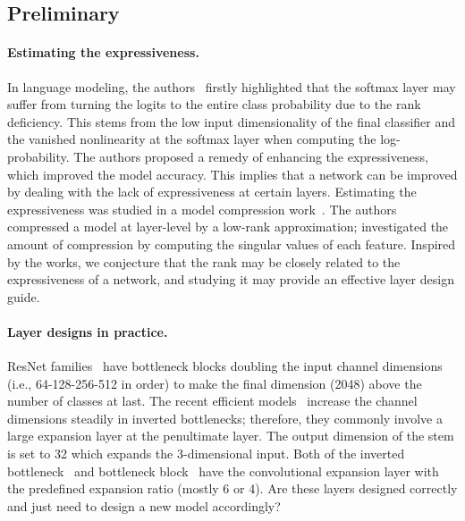 \subsection{Preliminary}
\label{subsection:preliminary}
\paragraph{Estimating the expressiveness.} 
In language modeling, the authors~\cite{yang2017breaking} firstly highlighted that the softmax layer may suffer from turning the logits to the entire class probability due to the rank deficiency. This stems from the low input dimensionality of the final classifier and the vanished nonlinearity at the softmax layer when computing the log-probability. The authors proposed a remedy of enhancing the expressiveness, which improved the model accuracy. This implies that a network can be improved by dealing with the lack of expressiveness at certain layers. Estimating the expressiveness was studied in a model compression work~\cite{zhang2015efficient}. The authors compressed a model at layer-level by a low-rank approximation; investigated the amount of compression by computing the singular values of each feature. Inspired by the works, we conjecture that the rank may be closely related to the expressiveness of a network, and studying it may provide an effective layer design guide.
\vspace{-4mm}

\paragraph{Layer designs in practice.} ResNet families~\cite{resnet, preresnet,resnext} have bottleneck blocks doubling the input channel dimensions (i.e., 64-128-256-512 in order) to make the final dimension (2048) above the number of classes at last. The recent efficient models~\cite{fbnet, chamnet, proxylessnas,mobilenetv3,mnasnet, tan2019mixconv,efficientnet, fbnetv2, mei2020atomnas, chu2019fairnas, chu2019fairdarts, liang2019dartsplus} increase the channel dimensions steadily in inverted bottlenecks; therefore, they commonly involve a large expansion layer at the penultimate layer. The output dimension of the stem is set to 32 which expands the 3-dimensional input. Both of the inverted bottleneck~\cite{mobilenetv2} and bottleneck block~\cite{resnet} have the convolutional expansion layer with the predefined expansion ratio (mostly 6 or 4). Are these layers designed correctly and just need to design a new model accordingly? 

